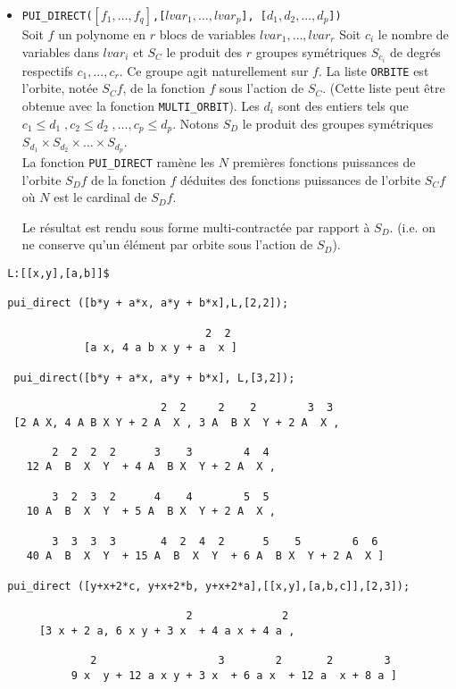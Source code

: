 \normalsize
\begin{itemize}
\item{\tt PUI\_DIRECT($[f_1, \ldots, f_q]$,[$lvar_1,\ldots ,lvar_p$],
[$d_1,d_2,...,d_p$])}\\
 Soit $f$ un polynome en $r$ blocs de variables $lvar_1,\ldots ,lvar_r$
  Soit $c_i$ le nombre de variables dans $lvar_i$  et $S_C$ le produit des $r$
  groupes sym\'etriques $S_{c_i}$ de degr\'es respectifs
  $c_1,...,c_r$. Ce groupe agit
  naturellement sur $f$.
  La liste {\tt ORBITE} est l'orbite, not\'ee $S_Cf$, de la fonction $f$ 
  sous  l'action de $S_C$. (Cette liste peut \^etre obtenue avec la fonction 
  {\tt MULTI\_ORBIT}).
  Les $d_i$ sont des entiers tels que 
  $c_1\leq d_1\;, c_2 \leq d_2 \;,\ldots ,c_p\leq d_p$.
  Notons $S_D$ le produit des groupes sym\'etriques 
$S_{d_1} \times S_{d_2} \times \ldots \times S_{d_p}$.\\

  La fonction {\tt PUI\_DIRECT} ram\`ene les $N$ premi\`eres fonctions 
  puissances de l'orbite $S_Df$ de la fonction $f$
  d\'eduites des fonctions puissances de l'orbite $S_Cf$ o\`u 
  $N$ est le cardinal de $S_Df$.

  Le r\'esultat est rendu sous forme multi-contract\'ee par rapport \`a $S_D$.
 (i.e. on ne conserve qu'un \'el\'ement par orbite sous l'action de $S_D$).
\end{itemize}
\small
\begin{verbatim}
 L:[[x,y],[a,b]]$

 pui_direct ([b*y + a*x, a*y + b*x],L,[2,2]);

                                2  2
             [a x, 4 a b x y + a  x ]

  pui_direct([b*y + a*x, a*y + b*x], L,[3,2]);

                         2  2     2    2        3  3
  [2 A X, 4 A B X Y + 2 A  X , 3 A  B X  Y + 2 A  X ,

        2  2  2  2      3    3        4  4
    12 A  B  X  Y  + 4 A  B X  Y + 2 A  X ,

        3  2  3  2      4    4        5  5
    10 A  B  X  Y  + 5 A  B X  Y + 2 A  X ,

        3  3  3  3       4  2  4  2      5    5        6  6
    40 A  B  X  Y  + 15 A  B  X  Y  + 6 A  B X  Y + 2 A  X ]

 pui_direct ([y+x+2*c, y+x+2*b, y+x+2*a],[[x,y],[a,b,c]],[2,3]);

                             2              2
      [3 x + 2 a, 6 x y + 3 x  + 4 a x + 4 a , 

              2                   3        2       2        3
           9 x  y + 12 a x y + 3 x  + 6 a x  + 12 a  x + 8 a ]


\end{verbatim}
